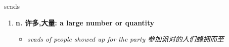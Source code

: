
\begin{frame}
{\huge scads}
\begin{center}
\begin{enumerate}\Large
  \item \textbf{n. 许多,大量: a large number or quantity}
  \begin{itemize}
    \item \em{\Large{scads of people showed up for the party 参加派对的人们蜂拥而至}}
  \end{itemize}
\end{enumerate}
\end{center}
\end{frame}
